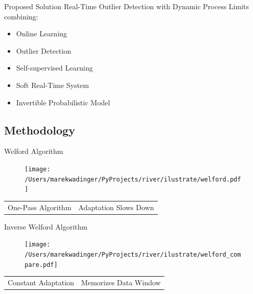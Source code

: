 \documentclass[aspectratio=169]{beamer}
\begin{document}
\begin{frame}{Proposed Solution}
    Real-Time Outlier Detection with Dynamic Process Limits
    combining:
    \begin{itemize}
        \item Online Learning
        \item Outlier Detection
        \item Self-supervised Learning
        \item Soft Real-Time System
        \item Invertible Probabilistic Model
    \end{itemize}
\end{frame}

\subsection{Methodology}


\begin{frame}{Welford Algorithm}
    \begin{figure}
        \begin{center}
            \texttt{[image: /Users/marekwadinger/PyProjects/river/ilustrate/welford.pdf]}
        \end{center}
    \end{figure}
    \begin{table}
        \centering
        \begin{tabular}{c|c}
            {\color{green}{$+$}} One-Pass Algorithm & {\color{red}{$-$}} Adaptation Slows Down \\
        \end{tabular}
    \end{table}
\end{frame}

\begin{frame}{Inverse Welford Algorithm}
    \begin{figure}
        \begin{center}
            \texttt{[image: /Users/marekwadinger/PyProjects/river/ilustrate/welford\_compare.pdf]}
        \end{center}
    \end{figure}
    \begin{table}
        \centering
        \begin{tabular}{c|c}
            {\color{green}{$+$}} Constant Adaptation & {\color{red}{$-$}} Memorizes Data Window \\
        \end{tabular}
    \end{table}
\end{frame}
\end{document}
